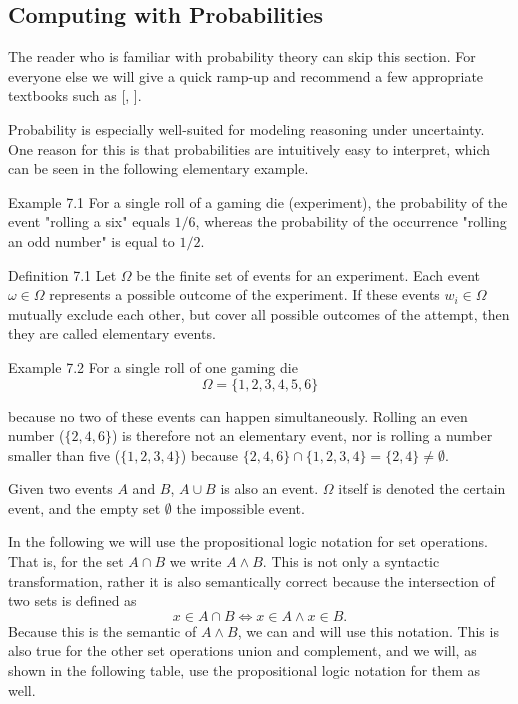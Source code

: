 \documentclass[10pt]{book}
\begin{document}
\subsection{Computing with Probabilities}
The reader who is familiar with probability theory can skip this section. For everyone else we will give a quick ramp-up and recommend a few appropriate textbooks such as [\cite{ross2009introprob}, \cite{freedman2007statistics}].

Probability is especially well-suited for modeling reasoning under uncertainty. One reason for this is that probabilities are intuitively easy to interpret, which can be seen in the following elementary example.

Example 7.1 For a single roll of a gaming die (experiment), the probability of the event "rolling a six" equals $1 / 6$, whereas the probability of the occurrence "rolling an odd number" is equal to $1 / 2$.

Definition 7.1 Let $\Omega$ be the finite set of events for an experiment. Each event $\omega \in \Omega$ represents a possible outcome of the experiment. If these events $w_{i} \in \Omega$ mutually exclude each other, but cover all possible outcomes of the attempt, then they are called elementary events.

Example 7.2 For a single roll of one gaming die
$$
\Omega=\{1,2,3,4,5,6\}
$$

because no two of these events can happen simultaneously. Rolling an even number ($\{2,4,6\}$) is therefore not an elementary event, nor is rolling a number smaller than five ($\{1,2,3,4\}$) because $\{2,4,6\} \cap \{1,2,3,4\}=\{2,4\} \neq \emptyset$.

Given two events $A$ and $B$, $A \cup B$ is also an event. $\Omega$ itself is denoted the certain event, and the empty set $\emptyset$ the impossible event.

In the following we will use the propositional logic notation for set operations. That is, for the set $A \cap B$ we write $A \wedge B$. This is not only a syntactic transformation, rather it is also semantically correct because the intersection of two sets is defined as
$$
x \in A \cap B \Leftrightarrow x \in A \wedge x \in B .
$$
Because this is the semantic of $A \wedge B$, we can and will use this notation. This is also true for the other set operations union and complement, and we will, as shown in the following table, use the propositional logic notation for them as well.
\end{document}
